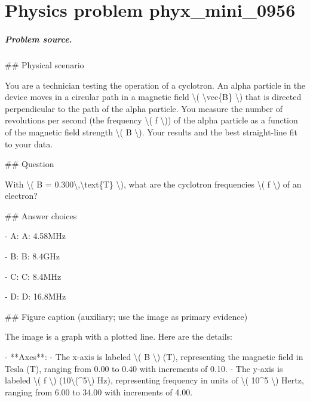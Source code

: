 
\chapter{Physics problem phyx\_mini\_0956}
\label{ch:PhyXMiniProblems_problem_phyx_mini_0956}

\paragraph{Problem source.}
\#\# Physical scenario

You are a technician testing the operation of a cyclotron. An alpha particle in the device moves in a circular path in a magnetic field \textbackslash{}( \textbackslash{}vec\{B\} \textbackslash{}) that is directed perpendicular to the path of the alpha particle. You measure the number of revolutions per second (the frequency \textbackslash{}( f \textbackslash{})) of the alpha particle as a function of the magnetic field strength \textbackslash{}( B \textbackslash{}). Your results and the best straight-line fit to your data.

\#\# Question

With \textbackslash{}( B = 0.300\textbackslash{},\textbackslash{}text\{T\} \textbackslash{}), what are the cyclotron frequencies \textbackslash{}( f \textbackslash{}) of an electron?

\#\# Answer choices

- A: A: 4.58MHz

- B: B: 8.4GHz

- C: C: 8.4MHz

- D: D: 16.8MHz

\#\# Figure caption (auxiliary; use the image as primary evidence)

The image is a graph with a plotted line. Here are the details:

- **Axes**:
  - The x-axis is labeled \textbackslash{}( B \textbackslash{}) (T), representing the magnetic field in Tesla (T), ranging from 0.00 to 0.40 with increments of 0.10.
  - The y-axis is labeled \textbackslash{}( f \textbackslash{}) (10\textbackslash{}(\textasciicircum{}5\textbackslash{}) Hz), representing frequency in units of \textbackslash{}( 10\textasciicircum{}5 \textbackslash{}) Hertz, ranging from 6.00 to 34.00 with increments of 4.00.

